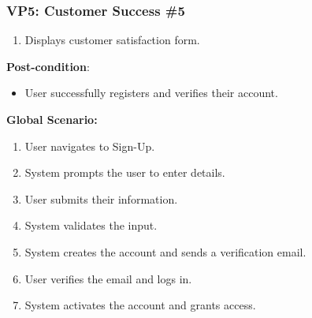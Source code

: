 \documentclass[]{article}
\begin{document}
\begin{enumerate}[{\bf BE1.}]
	\subsubsection*{VP5: Customer Success \#5}
	\begin{enumerate}
		\item Displays customer satisfaction form.
	\end{enumerate}

	\textbf{Post-condition}:  
	\begin{itemize}
		\item User successfully registers and verifies their account.
	\end{itemize}

	\textbf{Global Scenario:}
	\begin{enumerate}
		\item User navigates to Sign-Up.
		\item System prompts the user to enter details.
		\item User submits their information.
		\item System validates the input.
		\item System creates the account and sends a verification email.
		\item User verifies the email and logs in.
		\item System activates the account and grants access.
	\end{enumerate}



		



\end{enumerate}
\end{document}
